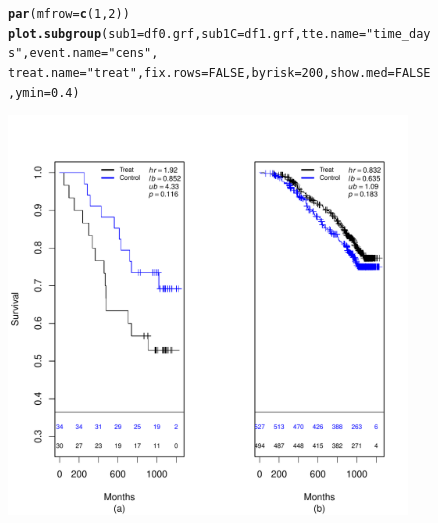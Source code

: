 \documentclass[9pt]{article}\usepackage[]{graphicx}\usepackage[]{xcolor}
\makeatletter
\newcommand{\hlnum}[1]{\textcolor[rgb]{0.686,0.059,0.569}{#1}}%
\newcommand{\hlstr}[1]{\textcolor[rgb]{0.192,0.494,0.8}{#1}}%
\newcommand{\hlstd}[1]{\textcolor[rgb]{0.345,0.345,0.345}{#1}}%
\newcommand{\hlkwc}[1]{\textcolor[rgb]{0.333,0.667,0.333}{#1}}%
\newcommand{\hlkwd}[1]{\textcolor[rgb]{0.737,0.353,0.396}{\textbf{#1}}}%
\newenvironment{kframe}{%
 \def\at@end@of@kframe{}%
 \ifinner\ifhmode%
  \def\at@end@of@kframe{\end{minipage}}%
  \begin{minipage}{\columnwidth}%
 \fi\fi%
 \def\FrameCommand##1{\hskip\@totalleftmargin \hskip-\fboxsep
 \colorbox{shadecolor}{##1}\hskip-\fboxsep
     \hskip-\linewidth \hskip-\@totalleftmargin \hskip\columnwidth}%
 \MakeFramed {\advance\hsize-\width
   \@totalleftmargin\z@ \linewidth\hsize
   \@setminipage}}%
 {\par\unskip\endMakeFramed%
 \at@end@of@kframe}
\newenvironment{knitrout}{}{} %
\theoremstyle{definition}
\theoremstyle{remark}
\makeatother
\begin{document}
\begin{figure}[h!]
\begin{center}
\begin{knitrout}
\color{fgcolor}\begin{kframe}
\begin{alltt}
\hlkwd{par}\hlstd{(}\hlkwc{mfrow} \hlstd{=} \hlkwd{c}\hlstd{(}\hlnum{1}\hlstd{,} \hlnum{2}\hlstd{))}
\hlkwd{plot.subgroup}\hlstd{(}\hlkwc{sub1} \hlstd{= df0.grf,} \hlkwc{sub1C} \hlstd{= df1.grf,} \hlkwc{tte.name} \hlstd{=} \hlstr{"time_days"}\hlstd{,} \hlkwc{event.name} \hlstd{=} \hlstr{"cens"}\hlstd{,}
    \hlkwc{treat.name} \hlstd{=} \hlstr{"treat"}\hlstd{,} \hlkwc{fix.rows} \hlstd{=} \hlnum{FALSE}\hlstd{,} \hlkwc{byrisk} \hlstd{=} \hlnum{200}\hlstd{,} \hlkwc{show.med} \hlstd{=} \hlnum{FALSE}\hlstd{,} \hlkwc{ymin} \hlstd{=} \hlnum{0.4}\hlstd{)}
\end{alltt}
\end{kframe}
\includegraphics[width=400px,height=400px]{figure/grf_sg-1} 
\end{knitrout}
\end{center}
\end{figure}
\end{document}
